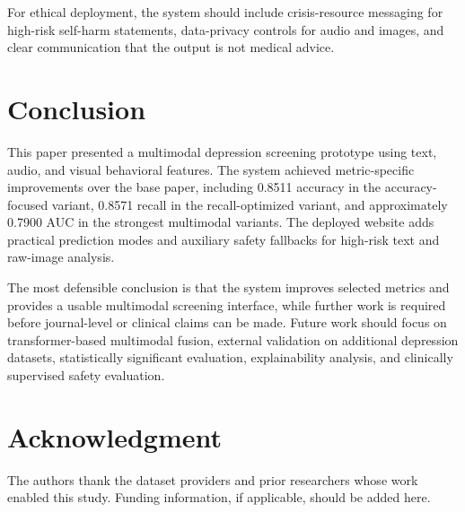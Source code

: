 \documentclass[conference]{IEEEtran}
\begin{document}
For ethical deployment, the system should include crisis-resource messaging for high-risk self-harm statements, data-privacy controls for audio and images, and clear communication that the output is not medical advice.

\section{Conclusion}
This paper presented a multimodal depression screening prototype using text, audio, and visual behavioral features. The system achieved metric-specific improvements over the base paper, including 0.8511 accuracy in the accuracy-focused variant, 0.8571 recall in the recall-optimized variant, and approximately 0.7900 AUC in the strongest multimodal variants. The deployed website adds practical prediction modes and auxiliary safety fallbacks for high-risk text and raw-image analysis.

The most defensible conclusion is that the system improves selected metrics and provides a usable multimodal screening interface, while further work is required before journal-level or clinical claims can be made. Future work should focus on transformer-based multimodal fusion, external validation on additional depression datasets, statistically significant evaluation, explainability analysis, and clinically supervised safety evaluation.

\FloatBarrier

\section*{Acknowledgment}
The authors thank the dataset providers and prior researchers whose work enabled this study. Funding information, if applicable, should be added here.

\FloatBarrier
\end{document}
